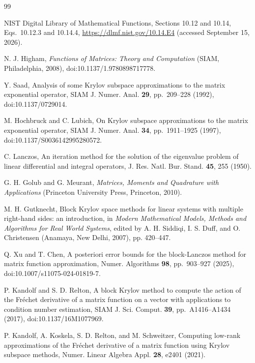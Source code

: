 \documentclass[10pt,letterpaper,twoside]{article}
\begin{document}
\begin{thebibliography}{99}

NIST Digital Library of Mathematical Functions, Sections 10.12 and 10.14,
Eqs.~10.12.3 and 10.14.4, \url{https://dlmf.nist.gov/10.14.E4}
(accessed September 15, 2026).

N. J. Higham, \textit{Functions of Matrices: Theory and Computation}
(SIAM, Philadelphia, 2008), doi:10.1137/1.9780898717778.

Y. Saad, Analysis of some Krylov subspace approximations to the matrix
exponential operator, SIAM J. Numer. Anal. \textbf{29}, pp.~209--228 (1992),
doi:10.1137/0729014.

M. Hochbruck and C. Lubich, On Krylov subspace approximations to the matrix
exponential operator, SIAM J. Numer. Anal. \textbf{34}, pp.~1911--1925 (1997),
doi:10.1137/S0036142995280572.

C. Lanczos, An iteration method for the solution of the eigenvalue problem of
linear differential and integral operators, J. Res. Natl. Bur. Stand.
\textbf{45}, 255 (1950).

G. H. Golub and G. Meurant, \textit{Matrices, Moments and Quadrature with
Applications} (Princeton University Press, Princeton, 2010).

M. H. Gutknecht, Block Krylov space methods for linear systems with multiple
right-hand sides: an introduction, in \textit{Modern Mathematical Models,
Methods and Algorithms for Real World Systems}, edited by A. H. Siddiqi,
I. S. Duff, and O. Christensen (Anamaya, New Delhi, 2007), pp. 420--447.

Q. Xu and T. Chen, A posteriori error bounds for the block-Lanczos method for
matrix function approximation, Numer. Algorithms \textbf{98}, pp.~903--927
(2025), doi:10.1007/s11075-024-01819-7.

P. Kandolf and S. D. Relton, A block Krylov method to compute the action of the
Fr\'echet derivative of a matrix function on a vector with applications to
condition number estimation, SIAM J. Sci. Comput. \textbf{39}, pp.~A1416--A1434 (2017),
doi:10.1137/16M1077969.

P. Kandolf, A. Koskela, S. D. Relton, and M. Schweitzer, Computing low-rank
approximations of the Fr\'echet derivative of a matrix function using Krylov
subspace methods, Numer. Linear Algebra Appl. \textbf{28}, e2401 (2021).


\end{thebibliography}
\end{document}
